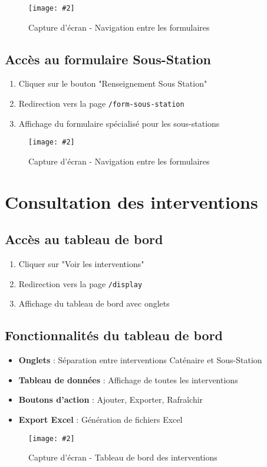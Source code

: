 \documentclass[12pt,a4paper]{report}
\newcommand{\screenshot}[3][]{%
\begin{figure}[H]
\centering
\texttt{[image: \#2]}
\caption{#3}
\end{figure}
}
\begin{document}
\screenshot{nav_cat.png}{Capture d'écran - Navigation entre les formulaires}

\subsection{Accès au formulaire Sous-Station}
\begin{enumerate}
    \item Cliquer sur le bouton "Renseignement Sous Station"
    \item Redirection vers la page \texttt{/form-sous-station}
    \item Affichage du formulaire spécialisé pour les sous-stations
\end{enumerate}

\screenshot{nav_ss.png}{Capture d'écran - Navigation entre les formulaires}

\section{Consultation des interventions}

\subsection{Accès au tableau de bord}
\begin{enumerate}
    \item Cliquer sur "Voir les interventions"
    \item Redirection vers la page \texttt{/display}
    \item Affichage du tableau de bord avec onglets
\end{enumerate}

\subsection{Fonctionnalités du tableau de bord}
\begin{itemize}
    \item \textbf{Onglets} : Séparation entre interventions Caténaire et Sous-Station
    \item \textbf{Tableau de données} : Affichage de toutes les interventions
    \item \textbf{Boutons d'action} : Ajouter, Exporter, Rafraîchir
    \item \textbf{Export Excel} : Génération de fichiers Excel
\end{itemize}

\screenshot{dashboard.png}{Capture d'écran - Tableau de bord des interventions}
\end{document}
